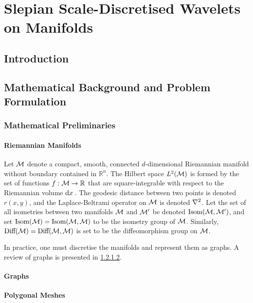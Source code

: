 \chapter{Slepian Scale-Discretised Wavelets on Manifolds}\label{sec:chapter4}

\section{Introduction}

\section{Mathematical Background and Problem Formulation}

\subsection{Mathematical Preliminaries}

\subsubsection{Riemannian Manifolds}

Let \(\mathcal{M}{}\) denote a compact, smooth, connected \(d\)-dimensional Riemannian manifold without boundary contained in \(\mathbb{R}^{n}\).
The Hilbert space \(L^{2}(\mathcal{M})\) is formed by the set of functions \(f : \mathcal{M} \to \mathbb{R}\) that are square-integrable with respect to the Riemannian volume \(\dd{x}{}\).
The geodesic distance between two points is denoted \(r(x,y)\), and the Laplace-Beltrami operator on \(\mathcal{M}{}\) is denoted \(\laplacian{}\).
Let the set of all isometries between two manifolds \(\mathcal{M}{}\) and \(\mathcal{M}'\) be denoted \(\text{Isom}(\mathcal{M},\mathcal{M}')\), and set \(\text{Isom}(\mathcal{M}) = \text{Isom}(\mathcal{M},\mathcal{M})\) to be the isometry group of \(\mathcal{M}{}\).
Similarly, \(\text{Diff}(\mathcal{M}) = \text{Diff}(\mathcal{M},\mathcal{M})\) is set to be the diffeomorphism group on \(\mathcal{M}{}\).

In practice, one must discretise the manifolds and represent them as graphs.
A review of graphs is presented in \cref{sec:chapter4_graphs}.

\subsubsection{Graphs}\label{sec:chapter4_graphs}

\subsubsection{Polygonal Meshes}

